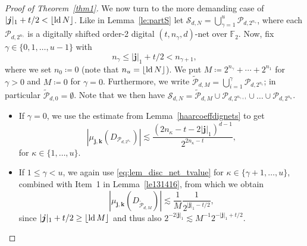 \documentclass[12pt, a4paper]{article}
\def\P{\mathcal{P}}
\def\S{\mathcal{S}}
\newcommand{\ld}{{\rm ld}\,}
\newcommand{\nicolas}[1]{\begingroup\color{teal}#1\endgroup}
\newcommand{\peter}[1]{\begingroup\color{violet}#1\endgroup}
\newcommand{\bsj}{{\boldsymbol{j}}}
\newcommand{\bsk}{{\boldsymbol{k}}}
\begin{document}
\begin{proof}[Proof of Theorem~\ref{thm1}]
We now turn to the more demanding case of $|\bsj|_1+t/2<\lfloor \ld N \rfloor$. Like in Lemma~\ref{le:partS} let $\S_{d,N}= \bigcup_{\gamma=1}^u \P_{d,2^{n_{\gamma}}}$, where each $\P_{d,2^{n_{\gamma}}}$ is a digitally shifted order-2 digital $(t,n_\gamma,d)$-net over $\mathbb{F}_2$. \peter{Now, fix} $\gamma\in \{0, 1,\ldots,u-1\}$ with
\[ 
n_{\gamma} \le |\bsj|_1+t/2 < n_{\gamma+1},
\]
where we set $n_0 \coloneqq 0$ (note that $n_u = \lfloor \ld N\rfloor$). %
We put $M\coloneqq 2^{n_\gamma}+\cdots+2^{n_1}$ for $\gamma > 0$ and $M\coloneqq0$ for $\gamma=0$. Furthermore, we write $\widetilde{\P}_{d,M} = \bigcup_{i=1}^{\gamma} \P_{d,2^{n_i}}$; in particular $\widetilde{\P}_{d,0} = \emptyset$. Note that we then have 
$ \S_{d,N}=\widetilde{\P}_{d,M} \cup \P_{d,2^{n_{\gamma+1}}} \cup\ldots\cup \P_{d,2^{n_{u}}}$.
\begin{itemize}
\item If $\gamma=0$, we use the estimate from Lemma~\ref{haarcoeffdignets} to get
\begin{equation}\label{eq:lem_disc_net_tvalue}
|\mu_{\bsj,\bsk}(D_{\P_{d,2^{n_\kappa}}})| \lesssim  \frac{(2n_\kappa - t - 2|\bsj|_1)^{d-1}}{2^{2n_\kappa - t}}, 
\end{equation}
for $\kappa\in \{1,\ldots , u\}$.
\item If $1\le \gamma < u$, we again use \eqref{eq:lem_disc_net_tvalue} for $\kappa \in \{\gamma+1,\ldots , u\}$, combined with Item~1 in Lemma~\ref{le131416}, from which we obtain
\begin{equation*}%
|\mu_{\bsj,\bsk}(D_{\widetilde{\P}_{d,M}})| \lesssim  \frac{1}{M} \frac{1}{2^{|\bsj|_1-t/2}}, 
\end{equation*}
since $|\bsj|_1+t/2\ge \lfloor \ld M \rfloor$ and thus also $2^{-2|\bsj|_1} \lesssim M^{-1} 2^{-|\bsj|_1+t/2}$. 
\end{itemize}


\end{proof}
\end{document}
